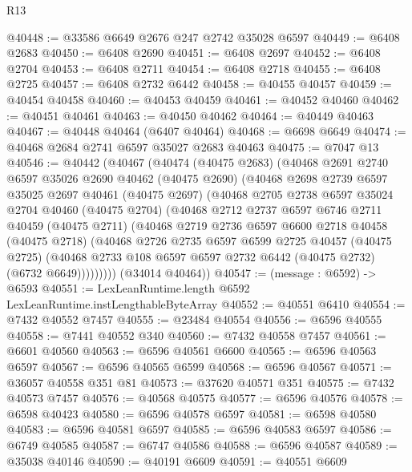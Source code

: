 \begin{lexlean}{R13}
\begin{coremodule}
@40448 := @33586 @6649 @2676 @247 @2742 @35028 @6597
@40449 := @6408 @2683
@40450 := @6408 @2690
@40451 := @6408 @2697
@40452 := @6408 @2704
@40453 := @6408 @2711
@40454 := @6408 @2718
@40455 := @6408 @2725
@40457 := @6408 @2732 @6442
@40458 := @40455 @40457
@40459 := @40454 @40458
@40460 := @40453 @40459
@40461 := @40452 @40460
@40462 := @40451 @40461
@40463 := @40450 @40462
@40464 := @40449 @40463
@40467 := @40448 @40464 (@6407 @40464)
@40468 := @6698 @6649
@40474 := @40468 @2684 @2741 @6597 @35027 @2683 @40463
@40475 := @7047 @13
@40546 := @40442
    (@40467
      (@40474
        (@40475 @2683)
        (@40468
          @2691
          @2740
          @6597
          @35026
          @2690
          @40462
          (@40475 @2690)
          (@40468
            @2698
            @2739
            @6597
            @35025
            @2697
            @40461
            (@40475 @2697)
            (@40468
              @2705
              @2738
              @6597
              @35024
              @2704
              @40460
              (@40475 @2704)
              (@40468
                @2712
                @2737
                @6597
                @6746
                @2711
                @40459
                (@40475 @2711)
                (@40468
                  @2719
                  @2736
                  @6597
                  @6600
                  @2718
                  @40458
                  (@40475 @2718)
                  (@40468
                    @2726
                    @2735
                    @6597
                    @6599
                    @2725
                    @40457
                    (@40475 @2725)
                    (@40468 @2733 @108 @6597 @6597 @2732 @6442 (@40475 @2732) (@6732 @6649)))))))))
      (@34014 @40464))
@40547 := (message : @6592) -> @6593
@40551 := LexLeanRuntime.length @6592 LexLeanRuntime.instLengthableByteArray
@40552 := @40551 @6410
@40554 := @7432 @40552 @7457
@40555 := @23484 @40554
@40556 := @6596 @40555
@40558 := @7441 @40552 @340
@40560 := @7432 @40558 @7457
@40561 := @6601 @40560
@40563 := @6596 @40561 @6600
@40565 := @6596 @40563 @6597
@40567 := @6596 @40565 @6599
@40568 := @6596 @40567
@40571 := @36057 @40558 @351 @81
@40573 := @37620 @40571 @351
@40575 := @7432 @40573 @7457
@40576 := @40568 @40575
@40577 := @6596 @40576
@40578 := @6598 @40423
@40580 := @6596 @40578 @6597
@40581 := @6598 @40580
@40583 := @6596 @40581 @6597
@40585 := @6596 @40583 @6597
@40586 := @6749 @40585
@40587 := @6747 @40586
@40588 := @6596 @40587
@40589 := @35038 @40146
@40590 := @40191 @6609
@40591 := @40551 @6609

\end{coremodule}
\end{lexlean}
